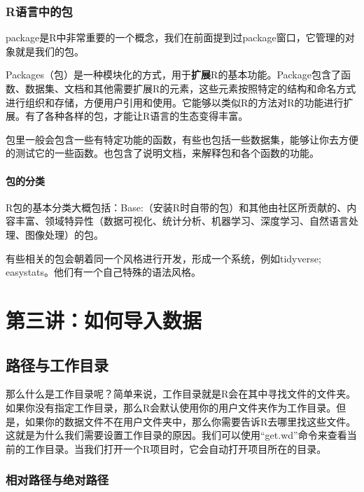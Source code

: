 \documentclass[
  oneside]{book}
\begin{document}
\hypertarget{2-packges}{%
\subsection{R语言中的包}\label{2-packges}}

package是R中非常重要的一个概念，我们在前面提到过package窗口，它管理的对象就是我们的包。

Packages（包）是一种模块化的方式，用于\textbf{扩展}R的基本功能。Package包含了函数、数据集、文档和其他需要扩展R的元素，这些元素按照特定的结构和命名方式进行组织和存储，方便用户引用和使用。它能够以类似R的方法对R的功能进行扩展。有了各种各样的包，才能让R语言的生态变得丰富。

包里一般会包含一些有特定功能的函数，有些也包括一些数据集，能够让你去方便的测试它的一些函数。也包含了说明文档，来解释包和各个函数的功能。

\hypertarget{2-packges-cat}{%
\subsubsection{包的分类}\label{2-packges-cat}}

R包的基本分类大概包括：Base:（安装R时自带的包）和其他由社区所贡献的、内容丰富、领域特异性（数据可视化、统计分析、机器学习、深度学习、自然语言处理、图像处理）的包。

有些相关的包会朝着同一个风格进行开发，形成一个系统，例如tidyverse;
easystats。他们有一个自己特殊的语法风格。

\hypertarget{lesson-3}{%
\chapter{第三讲：如何导入数据}\label{lesson-3}}

\hypertarget{3-path-working-dir}{%
\section{路径与工作目录}\label{3-path-working-dir}}

那么什么是工作目录呢？简单来说，工作目录就是R会在其中寻找文件的文件夹。如果你没有指定工作目录，那么R会默认使用你的用户文件夹作为工作目录。但是，如果你的数据文件不在用户文件夹中，那么你需要告诉R去哪里找这些文件。这就是为什么我们需要设置工作目录的原因。我们可以使用``get.wd''命令来查看当前的工作目录。当我们打开一个R项目时，它会自动打开项目所在的目录。

\hypertarget{3-path}{%
\subsection{相对路径与绝对路径}\label{3-path}}
\end{document}
